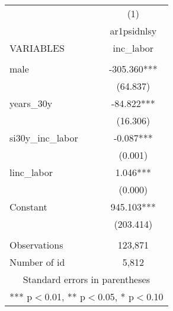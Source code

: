 \begin{tabular}{lc} \hline
 & (1) \\
 & ar1psidnlsy \\
VARIABLES & inc\_labor \\ \hline
 &  \\
male & -305.360*** \\
 & (64.837) \\
years\_30y & -84.822*** \\
 & (16.306) \\
si30y\_inc\_labor & -0.087*** \\
 & (0.001) \\
linc\_labor & 1.046*** \\
 & (0.000) \\
Constant & 945.103*** \\
 & (203.414) \\
 &  \\
Observations & 123,871 \\
 Number of id & 5,812 \\ \hline
\multicolumn{2}{c}{ Standard errors in parentheses} \\
\multicolumn{2}{c}{ *** p$<$0.01, ** p$<$0.05, * p$<$0.10} \\
\end{tabular}
